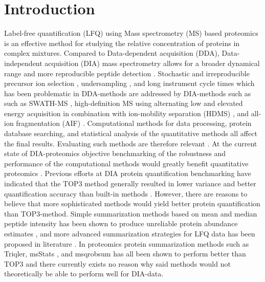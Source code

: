 \documentclass[10pt,letterpaper]{article}
\begin{document}
\section*{Introduction}
Label-free quantification (LFQ) using Mass spectrometry (MS) based proteomics is an effective method for studying the relative concentration of proteins in complex mixtures. Compared to Data-dependent acquisition (DDA), Data-independent acquisition (DIA) mass spectrometry allows for a broader dynamical range and more reproducible peptide detection 
 \cite{zhang2020DIA, Lu2021DIAmeter}. Stochastic and irreproducible precursor ion selection \cite{liu2004model} \cite{li2009database}, undersampling \cite{michalski2011more}, and long instrument cycle times \cite{li2009database} which has been problematic in DDA-methods are  addressed by DIA-methods such as such as SWATH-MS \cite{gillet2012targeted}, high-definition MS using alternating low and elevated energy acquisition in combination with ion-mobility separation (HDMS) \cite{geromanos2012using}, and all-ion fragmentation (AIF) \cite{geiger2010proteomics}. Computational methods for data processing, protein database searching, and statistical analysis of the quantitative methods all affect the final results. Evaluating such methods are therefore relevant \cite{gatto2016testing}. At the current state of DIA-proteomics objective benchmarking of the robustness and performance of the computational methods would greatly benefit quantitative proteomics \cite{navarro2016multicenter}. Previous efforts at DIA protein quantification benchmarking have indicated that the TOP3 method generally resulted in lower variance and better quantification accuracy than built-in methods \cite{navarro2016multicenter}. However, there are reasons to believe that more sophisticated methods would yield better protein quantification than TOP3-method. Simple summarization methods based on mean and median peptide intensity has been shown to produce unreliable protein abundance estimates \cite{goeminne2015summarization}, and more advanced summarization strategies for LFQ data has been proposed in literature \cite{silva2006absolute} \cite{cox2014accurate} \cite{zhang2018proteome} \cite{choi2014msstats}. In proteomics protein summarization methods such as Triqler\cite{The2018Integrated}, msStats \cite{choi2014msstats}, and msqrobsum \cite{sticker2020robust} has all been shown to perform better than TOP3 and there currently exists no reason why said methods would not theoretically be able to perform well for DIA-data. 
 
\end{document}
